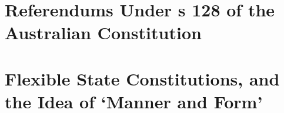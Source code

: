 \section{Referendums Under s 128 of the Australian Constitution}

\section{Flexible State Constitutions, and the Idea of `Manner and Form'}